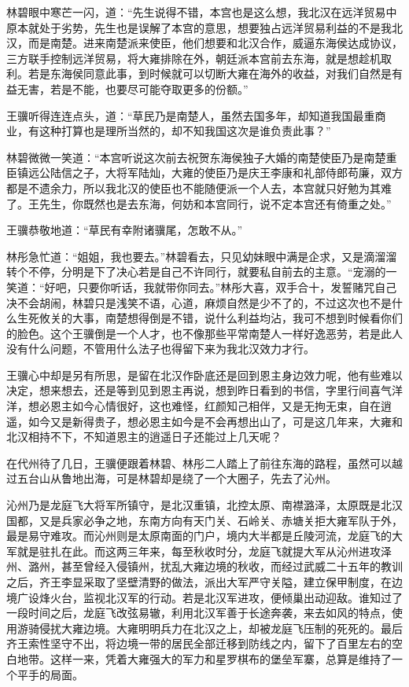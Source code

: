 林碧眼中寒芒一闪，道：“先生说得不错，本宫也是这么想，我北汉在远洋贸易中原本就处于劣势，先生也是误解了本宫的意思，想要独占远洋贸易利益的不是我北汉，而是南楚。进来南楚派来使臣，他们想要和北汉合作，威逼东海侯达成协议，三方联手控制远洋贸易，将大雍排除在外，朝廷派本宫前去东海，就是想趁机取利。若是东海侯同意此事，到时候就可以切断大雍在海外的收益，对我们自然是有益无害，若是不能，也要尽可能夺取更多的份额。”

王骥听得连连点头，道：“草民乃是南楚人，虽然去国多年，却知道我国最重商业，有这种打算也是理所当然的，却不知我国这次是谁负责此事？”

林碧微微一笑道：“本宫听说这次前去祝贺东海侯独子大婚的南楚使臣乃是南楚重臣镇远公陆信之子，大将军陆灿，大雍的使臣乃是庆王李康和礼部侍郎苟廉，双方都是不遗余力，所以我北汉的使臣也不能随便派一个人去，本宫就只好勉为其难了。王先生，你既然也是去东海，何妨和本宫同行，说不定本宫还有倚重之处。”

王骥恭敬地道：“草民有幸附诸骥尾，怎敢不从。”

林彤急忙道：“姐姐，我也要去。”林碧看去，只见幼妹眼中满是企求，又是滴溜溜转个不停，分明是下了决心若是自己不许同行，就要私自前去的主意。“宠溺的一笑道：“好吧，只要你听话，我就带你同去。”林彤大喜，双手合十，发誓赌咒自己决不会胡闹，林碧只是浅笑不语，心道，麻烦自然是少不了的，不过这次也不是什么生死攸关的大事，南楚想得倒是不错，说什么利益均沾，我可不想到时候看你们的脸色。这个王骥倒是一个人才，也不像那些平常南楚人一样好逸恶劳，若是此人没有什么问题，不管用什么法子也得留下来为我北汉效力才行。

王骥心中却是另有所思，是留在北汉作卧底还是回到恩主身边效力呢，他有些难以决定，想来想去，还是等到见到恩主再说，想到昨日看到的书信，字里行间喜气洋洋，想必恩主如今心情很好，这也难怪，红颜知己相伴，又是无拘无束，自在逍遥，如今又是新得贵子，想必恩主如今是不会再想出山了，可是这几年来，大雍和北汉相持不下，不知道恩主的逍遥日子还能过上几天呢？

在代州待了几日，王骥便跟着林碧、林彤二人踏上了前往东海的路程，虽然可以越过五台山从鲁地出海，可是林碧却是绕了一个大圈子，先去了沁州。

沁州乃是龙庭飞大将军所镇守，是北汉重镇，北控太原、南襟潞泽，太原既是北汉国都，又是兵家必争之地，东南方向有天门关、石岭关、赤塘关拒大雍军队于外，最是易守难攻。而沁州则是太原南面的门户，境内大半都是丘陵河流，龙庭飞的大军就是驻扎在此。而这两三年来，每至秋收时分，龙庭飞就提大军从沁州进攻泽州、潞州，甚至曾经入侵镇州，扰乱大雍边境的秋收，而经过武威二十五年的教训之后，齐王李显采取了坚壁清野的做法，派出大军严守关隘，建立保甲制度，在边境广设烽火台，监视北汉军的行动。若是北汉军进攻，便倾巢出动迎敌。谁知过了一段时间之后，龙庭飞改弦易辙，利用北汉军善于长途奔袭，来去如风的特点，使用游骑侵扰大雍边境。大雍明明兵力在北汉之上，却被龙庭飞压制的死死的。最后齐王索性坚守不出，将边境一带的居民全部迁移到防线之内，留下了百里左右的空白地带。这样一来，凭着大雍强大的军力和星罗棋布的堡垒军寨，总算是维持了一个平手的局面。

